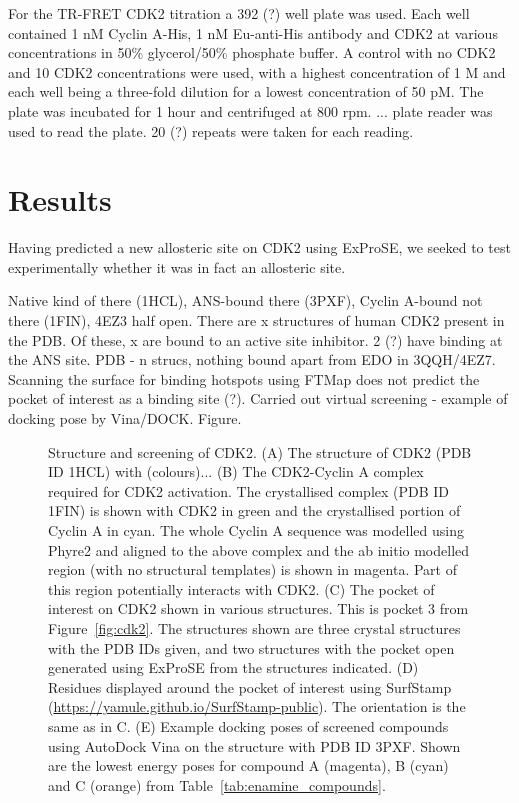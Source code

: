 For the TR-FRET CDK2 titration a 392 (?) well plate was used.
Each well contained 1 nM Cyclin A-His, 1 nM Eu-anti-His antibody and CDK2 at various concentrations in 50\% glycerol/50\% phosphate buffer.
A control with no CDK2 and 10 CDK2 concentrations were used, with a highest concentration of 1 \textmu M and each well being a three-fold dilution for a lowest concentration of 50 pM.
The plate was incubated for 1 hour and centrifuged at 800 rpm.
... plate reader was used to read the plate.
20 (?) repeats were taken for each reading.


\section{Results}
\label{sec:cdk2_results}

Having predicted a new allosteric site on CDK2 using ExProSE, we seeked to test experimentally whether it was in fact an allosteric site.

Native kind of there (1HCL), ANS-bound there (3PXF), Cyclin A-bound not there (1FIN), 4EZ3 half open.
There are x structures of human CDK2 present in the PDB.
Of these, x are bound to an active site inhibitor.
2 (?) have binding at the ANS site.
PDB - n strucs, nothing bound apart from EDO in 3QQH/4EZ7.
Scanning the surface for binding hotspots using FTMap \cite{Kozakov2015} does not predict the pocket of interest as a binding site (?).
Carried out virtual screening - example of docking pose by Vina/DOCK.
Figure.


\begin{figure}
\centering


\caption{Structure and screening of CDK2.
(A) The structure of CDK2 (PDB ID 1HCL) with (colours)...
(B) The CDK2-Cyclin A complex required for CDK2 activation.
The crystallised complex (PDB ID 1FIN) is shown with CDK2 in green and the crystallised portion of Cyclin A in cyan.
The whole Cyclin A sequence was modelled using Phyre2 \cite{Kelley2015} and aligned to the above complex and the ab initio modelled region (with no structural templates) is shown in magenta.
Part of this region potentially interacts with CDK2.
(C) The pocket of interest on CDK2 shown in various structures.
This is pocket 3 from Figure~\ref{fig:cdk2}.
The structures shown are three crystal structures with the PDB IDs given, and two structures with the pocket open generated using ExProSE from the structures indicated.
(D) Residues displayed around the pocket of interest using SurfStamp (\url{https://yamule.github.io/SurfStamp-public}). %
The orientation is the same as in C.
(E) Example docking poses of screened compounds using AutoDock Vina on the structure with PDB ID 3PXF.
Shown are the lowest energy poses for compound A (magenta), B (cyan) and C (orange) from Table~\ref{tab:enamine_compounds}.}

\label{fig:cdk2_structure}
\end{figure}


